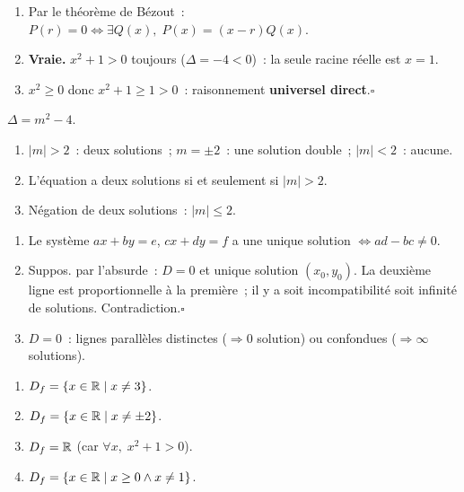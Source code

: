 
\begin{enumerate}
  \item Par le th\'eor\`eme de B\'ezout~:
        $P(r)=0\Leftrightarrow\exists Q(x),\;P(x)=(x-r)Q(x)$.
  \item \textbf{Vraie.} $x^2+1>0$ toujours ($\Delta=-4<0$)~:
        la seule racine r\'eelle est $x=1$.
  \item $x^2\geq0$ donc $x^2+1\geq1>0$~: raisonnement \textbf{universel direct}.\hfill$\square$
\end{enumerate}


$\Delta=m^2-4$.
\begin{enumerate}
  \item $|m|>2$~: deux solutions~; $m=\pm2$~: une solution double~; $|m|<2$~: aucune.
  \item \og L'\'equation a deux solutions si et seulement si $|m|>2$.\fg
  \item N\'egation de deux solutions~: $|m|\leq2$.
\end{enumerate}


\begin{enumerate}
  \item Le syst\`eme $ax+by=e$, $cx+dy=f$ a une unique solution
        $\Leftrightarrow ad-bc\ne0$.
  \item Suppos. par l'absurde~: $D=0$ et unique solution $(x_0,y_0)$.
        La deuxi\`eme ligne est proportionnelle \`a la premi\`ere~;
        il y a soit incompatibilit\'e soit infinit\'e de solutions.
        Contradiction.\hfill$\square$
  \item $D=0$~: lignes parall\`eles distinctes ($\Rightarrow0$ solution)
        ou confondues ($\Rightarrow\infty$ solutions).
\end{enumerate}


\begin{enumerate}
  \item $D_f=\{x\in\mathbb{R}\mid x\ne3\}$.
  \item $D_f=\{x\in\mathbb{R}\mid x\ne\pm2\}$.
  \item $D_f=\mathbb{R}$ (car $\forall x,\;x^2+1>0$).
  \item $D_f=\{x\in\mathbb{R}\mid x\geq0\wedge x\ne1\}$.
\end{enumerate}

